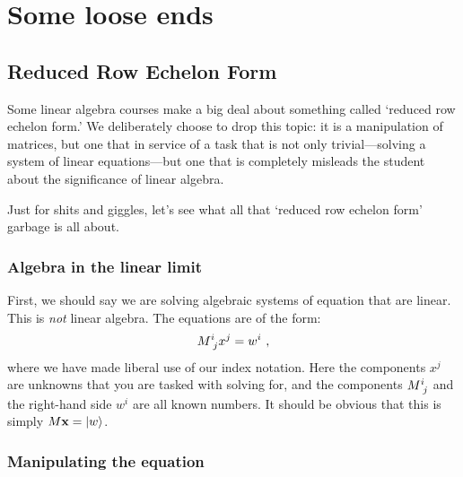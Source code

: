 \documentclass[12pt, oneside]{report}    %
\let\oldsection\section
\def\section{%
  \setcounter{sidenote}{1}%
  \oldsection
}
\begin{document}
\chapter{Some loose ends}


\section{Reduced Row Echelon Form}

Some linear algebra courses make a big deal about something called `reduced row echelon form.' We deliberately choose to drop this topic: it is a manipulation of matrices, but one that in service of a task that is not only trivial---solving a system of linear equations---but one that is completely misleads the student about the significance of linear algebra.

Just for shits and giggles, let's see what all that `reduced row echelon form' garbage is all about.

\subsection{Algebra in the linear limit}

First, we should say we are solving algebraic systems of equation that are linear. This is \emph{not} linear algebra. The equations are of the form:
\begin{align}
    M\aij{i}{j}x^j = w^i
    \ ,
    \label{eq:rref:eq}
\end{align}
where we have made liberal use of our index notation. Here the components $x^j$ are unknowns that you are tasked with solving for, and the components $M\aij{i}{j}$ and the right-hand side $w^i$ are all known numbers. It should be obvious that this is simply $M\mathbf{x} = \left|w\right\rangle$. 

\subsection{Manipulating the equation}
\end{document}
